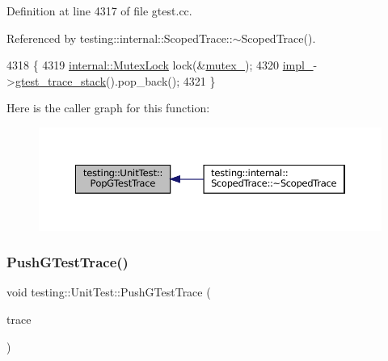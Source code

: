 Definition at line 4317 of file gtest.\+cc.



Referenced by testing\+::internal\+::\+Scoped\+Trace\+::$\sim$\+Scoped\+Trace().


\begin{DoxyCode}
4318                                  \{
4319   \hyperlink{namespacetesting_1_1internal_a08b187c6cc4e28400aadf9a32fccc8de}{internal::MutexLock} lock(&\hyperlink{classtesting_1_1UnitTest_abb94ef45cf0ab43be81ac6d5b1364132}{mutex\_});
4320   \hyperlink{classtesting_1_1UnitTest_a834685f92009d21b21a7307f4cbfb6e5}{impl\_}->\hyperlink{classtesting_1_1internal_1_1UnitTestImpl_af8c7c0a0c954e36d83e6e4690d3fb938}{gtest\_trace\_stack}().pop\_back();
4321 \}
\end{DoxyCode}
Here is the caller graph for this function\+:
\nopagebreak
\begin{figure}[H]
\begin{center}
\leavevmode
\includegraphics[width=350pt]{classtesting_1_1UnitTest_a70b3e3282778bc9a36520fe0a8be3c57_icgraph}
\end{center}
\end{figure}
\mbox{\label{classtesting_1_1UnitTest_af455b953108ff09b3b6e41011653e78a}} 
\subsubsection{\texorpdfstring{Push\+G\+Test\+Trace()}{PushGTestTrace()}}
{\footnotesize\ttfamily void testing\+::\+Unit\+Test\+::\+Push\+G\+Test\+Trace (\begin{DoxyParamCaption}\item[{const \hyperlink{structtesting_1_1internal_1_1TraceInfo}{internal\+::\+Trace\+Info} \&}]{trace }\end{DoxyParamCaption})\hspace{0.3cm}{\ttfamily [private]}}



